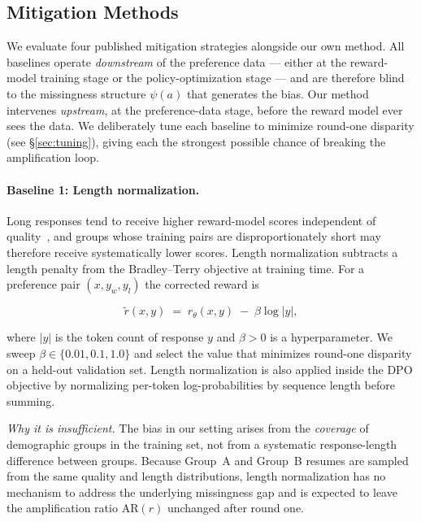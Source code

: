 
\subsection{Mitigation Methods}
\label{sec:mitigations}

We evaluate four published mitigation strategies alongside our own method.
All baselines operate \emph{downstream} of the preference data — either at the
reward-model training stage or the policy-optimization stage — and are therefore
blind to the missingness structure $\psi(a)$ that generates the bias.
Our method intervenes \emph{upstream}, at the preference-data stage, before
the reward model ever sees the data.
We deliberately tune each baseline to minimize round-one disparity (see
\S\ref{sec:tuning}), giving each the strongest possible chance of breaking the
amplification loop.

\paragraph{Baseline 1: Length normalization.}
Long responses tend to receive higher reward-model scores independent of
quality~\citep{singhal2023longisbet, park2024disentangling}, and groups whose
training pairs are disproportionately short may therefore receive systematically
lower scores.
Length normalization subtracts a length penalty from the Bradley--Terry
objective at training time.
For a preference pair $(x, y_w, y_l)$ the corrected reward is

\begin{equation}
    \tilde{r}(x, y) \;=\; r_\theta(x, y) \;-\; \beta \log |y|,
\label{eq:length_norm}
\end{equation}

where $|y|$ is the token count of response $y$ and $\beta > 0$ is a
hyperparameter.
We sweep $\beta \in \{0.01, 0.1, 1.0\}$ and select the value that minimizes
round-one disparity on a held-out validation set.
Length normalization is also applied inside the DPO objective by normalizing
per-token log-probabilities by sequence length before summing.

\emph{Why it is insufficient.}
The bias in our setting arises from the \emph{coverage} of demographic groups
in the training set, not from a systematic response-length difference between
groups.
Because Group~A and Group~B resumes are sampled from the same quality and
length distributions, length normalization has no mechanism to address the
underlying missingness gap and is expected to leave the amplification ratio
$\mathrm{AR}(r)$ unchanged after round one.

